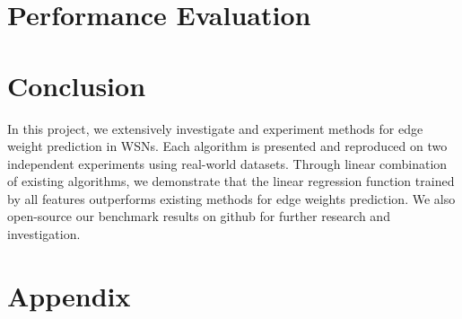 \documentclass{article}
\begin{document}










\section{Performance Evaluation}
\label{sec5}



\section{Conclusion}
\label{sec6}
In this project, we extensively investigate and experiment methods for edge weight prediction in WSNs.
Each algorithm is presented and reproduced on two independent experiments using real-world datasets.
Through linear combination of existing algorithms, we demonstrate that the linear regression function 
trained by all features outperforms existing methods for edge weights prediction. We also open-source 
our benchmark results on github for further research and investigation.






\section*{Appendix}



\end{document}
